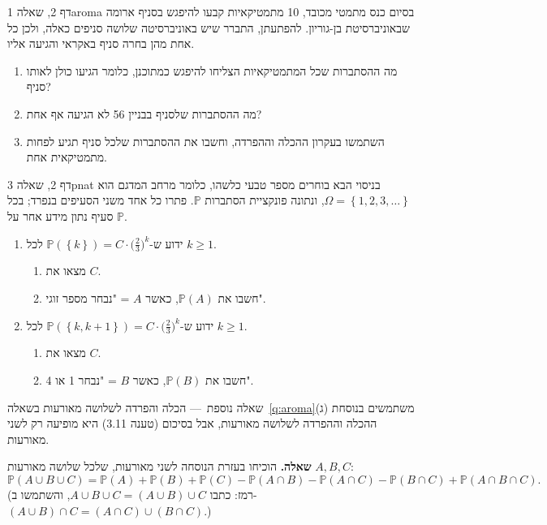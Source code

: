 \documentclass[11pt,a4paper]{report}
\newcommand{\set}[1]{\left\{#1\right\}}
\newcommand{\PP}{\mathbb{P}}
\newcommand{\dash}{{\rmfamily —}}
\begin{document}

\begin{exercise}{דף 2, שאלה 1}{aroma}
בסיום כנס מתמטי מכובד, 10 מתמטיקאיות קבעו להיפגש בסניף ארומה שבאוניברסיטת בן-גוריון. להפתעתן, התברר שיש באוניברסיטה שלושה סניפים כאלה, ולכן כל אחת מהן בחרה סניף באקראי והגיעה אליו.
\begin{enumerate}[label=(\alph*)]
  \item מה ההסתברות שכל המתמטיקאיות הצליחו להיפגש כמתוכנן, כלומר הגיעו כולן לאותו סניף?
  \item מה ההסתברות שלסניף בבניין 56 לא הגיעה אף אחת?
  \item השתמשו בעקרון ההכלה וההפרדה, וחשבו את ההסתברות שלכל סניף תגיע לפחות מתמטיקאית אחת.
\end{enumerate}
\end{exercise}

\begin{exercise}{דף 2, שאלה 3}{pnat}
בניסוי הבא בוחרים מספר טבעי כלשהו, כלומר מרחב המדגם הוא $\Omega=\set{1,2,3,\dots}$, ונתונה פונקציית הסתברות $\PP$. פתרו כל אחד משני הסעיפים בנפרד; בכל סעיף נתון מידע אחר על $\PP$.
\begin{enumerate}[label=(\alph*)]
  \item ידוע ש-$\PP(\set k)=C\cdot\big(\frac23\big)^k$ לכל $k\ge1$.
  \begin{enumerate}[label=(\arabic*)]
    \item מצאו את $C$.
    \item חשבו את $\PP(A)$, כאשר $A$ = "נבחר מספר זוגי".
  \end{enumerate}
  \item ידוע ש-$\PP(\set{k,k+1})=C\cdot\big(\frac23\big)^k$ לכל $k\ge1$.
  \begin{enumerate}[label=(\arabic*)]
    \item מצאו את $C$.
    \item חשבו את $\PP(B)$, כאשר $B$ = "נבחר 1 או 4".
  \end{enumerate}
\end{enumerate}
\end{exercise}

\begin{suggestion}{שאלה נוספת~\dash{} הכלה והפרדה לשלושה מאורעות}
בשאלה~\ref{q:aroma}(ג) משתמשים בנוסחת ההכלה וההפרדה לשלושה מאורעות, אבל בסיכום (טענה 3.11) היא מופיעה רק לשני מאורעות.

\textbf{שאלה.} הוכיחו בעזרת הנוסחה לשני מאורעות, שלכל שלושה מאורעות $A,B,C$:
\[
  \PP(A\cup B\cup C)=\PP(A)+\PP(B)+\PP(C)-\PP(A\cap B)-\PP(A\cap C)-\PP(B\cap C)+\PP(A\cap B\cap C).
\]
(רמז: כתבו $A\cup B\cup C=(A\cup B)\cup C$, והשתמשו ב-$(A\cup B)\cap C=(A\cap C)\cup(B\cap C)$.)
\end{suggestion}
\end{document}
